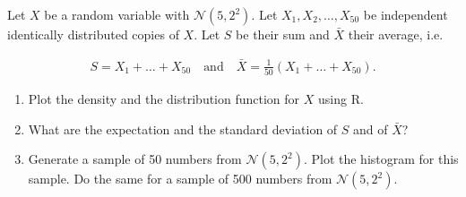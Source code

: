 
\begin{exercise}

Let $X$ be a random variable with $\mathcal{N}(5,2^2)$. Let $X_1,X_2,\dots,X_{50}$
be independent identically distributed copies of $X$. Let $S$ be their sum and $\bar{X}$
their average, i.e.

\begin{align*}
  S = X_1 + \dots + X_{50} \quad \text{and} \quad \bar{X} = \frac{1}{50}(X_1 + \dots + X_{50}).
\end{align*}

\begin{enumerate}[label = (\alph*)]
  \item Plot the density and the distribution function for $X$ using \textsc{R}.
  \item What are the expectation and the standard deviation of $S$ and of $\bar{X}$?
  \item Generate a sample of 50 numbers from $\mathcal{N}(5,2^2)$. Plot the histogram
  for this sample. Do the same for a sample of 500 numbers from $\mathcal{N}(5,2^2)$.
\end{enumerate}

\end{exercise}


\begin{solution}

\phantom{}

\end{solution}

